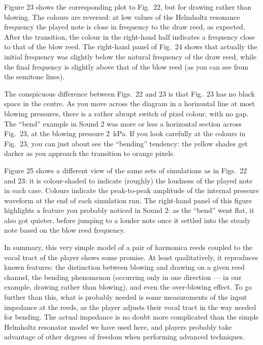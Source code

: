   Figure 23 shows the corresponding plot to Fig.\ 22, but for drawing rather 
  than blowing. The colours are reversed: at low values of the Helmholtz 
  resonance frequency the played note is close in frequency to the draw reed, 
  as expected. After the transition, the colour in the right-hand half 
  indicates a frequency close to that of the blow reed. The right-hand panel of 
  Fig.\ 24 shows that actually the initial frequency was slightly below the 
  natural frequency of the draw reed, while the final frequency is slightly 
  above that of the blow reed (as you can see from the semitone lines). 

  The conspicuous difference between Figs.\ 22 and 23 is that Fig.\ 23 has no 
  black space in the centre. As you move across the diagram in a horizontal 
  line at most blowing pressures, there is a rather abrupt switch of pixel 
  colour, with no gap. The “bend” example in Sound 2 was more or less a 
  horizontal section across Fig.\ 23, at the blowing pressure 2~kPa. If you 
  look carefully at the colours in Fig.\ 23, you can just about see the 
  “bending” tendency: the yellow shades get darker as you approach the 
  transition to orange pixels. 

  Figure 25 shows a different view of the same sets of simulations as in Figs.\ 
  22 and 23: it is colour-shaded to indicate (roughly) the loudness of the 
  played note in each case. Colours indicate the peak-to-peak amplitude of the 
  internal pressure waveform at the end of each simulation run. The right-hand 
  panel of this figure highlights a feature you probably noticed in Sound 2: as 
  the “bend” went flat, it also got quieter, before jumping to a louder note 
  once it settled into the steady note based on the blow reed frequency. 



  In summary, this very simple model of a pair of harmonica reeds coupled to 
  the vocal tract of the player shows some promise. At least qualitatively, it 
  reproduces known features: the distinction between blowing and drawing on a 
  given reed channel, the bending phenomenon (occurring only in one direction — 
  in our example, drawing rather than blowing), and even the over-blowing 
  effect. To go further than this, what is probably needed is some measurements 
  of the input impedance at the reeds, as the player adjusts their vocal tract 
  in the way needed for bending. The actual impedance is no doubt more 
  complicated than the simple Helmholtz resonator model we have used here, and 
  players probably take advantage of other degrees of freedom when performing 
  advanced techniques. 

